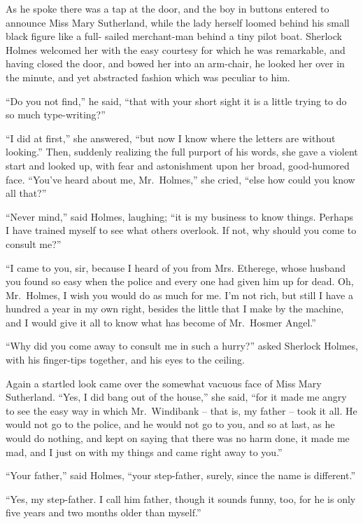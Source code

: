 As he spoke there was a tap at the door, and the boy in
buttons entered to announce Miss Mary Sutherland, while the
lady herself loomed behind his small black figure like a full-%
sailed merchant-man behind a tiny pilot boat. Sherlock
Holmes welcomed her with the easy courtesy for which he was
remarkable, and having closed the door, and bowed her into
an arm-chair, he looked her over in the minute, and yet abstracted
fashion which was peculiar to him.

“Do you not find,” he said, “that with your short sight it
is a little trying to do so much type-writing?”

“I did at first,” she answered, “but now I know where the
letters are without looking.” Then, suddenly realizing the
full purport of his words, she gave a violent start and looked
up, with fear and astonishment upon her broad, good-humored
face. “You’ve heard about me, Mr.~Holmes,” she cried, “else
how could you know all that?”

“Never mind,” said Holmes, laughing; “it is my business
to know things. Perhaps I have trained myself to see what
others overlook. If not, why should you come to consult me?”

“I came to you, sir, because I heard of you from Mrs.
Etherege, whose husband you found so easy when the police
and every one had given him up for dead. Oh, Mr.~Holmes,
I wish you would do as much for me. I’m not rich, but still
I have a hundred a year in my own right, besides the little
that I make by the machine, and I would give it all to know
what has become of Mr.~Hosmer Angel.”

“Why did you come away to consult me in such a hurry?”
asked Sherlock Holmes, with his finger-tips together, and his
eyes to the ceiling.

Again a startled look came over the somewhat vacuous face
of Miss Mary Sutherland. “Yes, I did bang out of the house,”
she said, “for it made me angry to see the easy way in which
Mr.~Windibank -- that is, my father -- took it all. He would
not go to the police, and he would not go to you, and so at
last, as he would do nothing, and kept on saying that there
was no harm done, it made me mad, and I just on with my
things and came right away to you.”

“Your father,” said Holmes, “your step-father, surely, since
the name is different.”

“Yes, my step-father. I call him father, though it sounds
funny, too, for he is only five years and two months older
than myself.”

